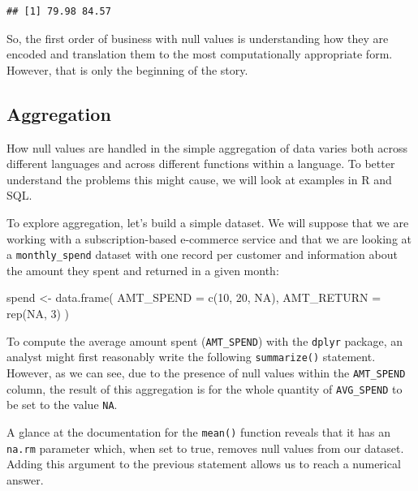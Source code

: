 \documentclass[
]{krantz}
\makeatletter
\newenvironment{Shaded}{\begin{snugshade}}{\end{snugshade}}
\newcommand{\AttributeTok}[1]{\textcolor[rgb]{0.61,0.61,0.61}{#1}}
\newcommand{\ConstantTok}[1]{\textcolor[rgb]{0,0,0}{#1}}
\newcommand{\DecValTok}[1]{\textcolor[rgb]{0.06,0.06,0.06}{#1}}
\newcommand{\FunctionTok}[1]{\textcolor[rgb]{0,0,0}{#1}}
\newcommand{\NormalTok}[1]{#1}
\newcommand{\OtherTok}[1]{\textcolor[rgb]{0.37,0.37,0.37}{#1}}
\newenvironment{kframe}{%
\medskip{}
\setlength{\fboxsep}{.8em}
 \def\at@end@of@kframe{}%
 \ifinner\ifhmode%
  \def\at@end@of@kframe{\end{minipage}}%
  \begin{minipage}{\columnwidth}%
 \fi\fi%
 \def\FrameCommand##1{\hskip\@totalleftmargin \hskip-\fboxsep
 \colorbox{shadecolor}{##1}\hskip-\fboxsep
     \hskip-\linewidth \hskip-\@totalleftmargin \hskip\columnwidth}%
 \MakeFramed {\advance\hsize-\width
   \@totalleftmargin\z@ \linewidth\hsize
   \@setminipage}}%
 {\par\unskip\endMakeFramed%
 \at@end@of@kframe}
\renewenvironment{Shaded}{\begin{kframe}}{\end{kframe}}
\makeatother
\begin{document}
\begin{verbatim}
## [1] 79.98 84.57
\end{verbatim}

So, the first order of business with null values is understanding how they are encoded and translation them to the most computationally appropriate form. However, that is only the beginning of the story.

\hypertarget{aggregation}{%
\subsection{Aggregation}\label{aggregation}}

How null values are handled in the simple aggregation of data varies both across different languages and across different functions within a language.
To better understand the problems this might cause, we will look at examples in R and SQL.

To explore aggregation, let's build a simple dataset. We will suppose that we are working with a subscription-based e-commerce service and that we are looking at a \texttt{monthly\_spend} dataset with one record per customer and information about the amount they spent and returned in a given month:

\begin{Shaded}
\begin{Highlighting}[]
\NormalTok{spend }\OtherTok{\textless{}{-}}
  \FunctionTok{data.frame}\NormalTok{(}
    \AttributeTok{AMT\_SPEND =} \FunctionTok{c}\NormalTok{(}\DecValTok{10}\NormalTok{, }\DecValTok{20}\NormalTok{, }\ConstantTok{NA}\NormalTok{),}
    \AttributeTok{AMT\_RETURN =} \FunctionTok{rep}\NormalTok{(}\ConstantTok{NA}\NormalTok{, }\DecValTok{3}\NormalTok{)}
\NormalTok{  )}
\end{Highlighting}
\end{Shaded}

To compute the average amount spent (\texttt{AMT\_SPEND}) with the \texttt{dplyr} package, an analyst might first reasonably write the following \texttt{summarize()} statement.
However, as we can see, due to the presence of null values within the \texttt{AMT\_SPEND} column, the result of this aggregation is for the whole quantity of \texttt{AVG\_SPEND} to be set to the value \texttt{NA}.

A glance at the documentation for the \texttt{mean()} function reveals that it has an \texttt{na.rm} parameter which, when set to true, removes null values from our dataset.
Adding this argument to the previous statement allows us to reach a numerical answer.
\end{document}
